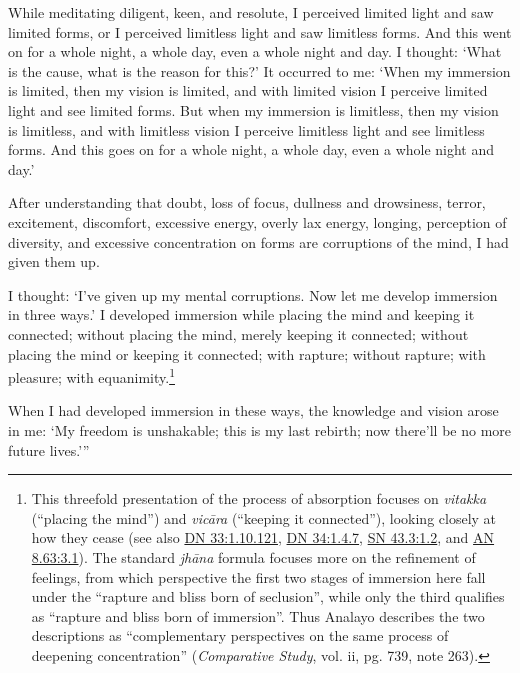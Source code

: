 \documentclass[12pt,openany]{book}%
\begin{document}
While meditating diligent, keen, and resolute, I perceived limited light and saw limited forms, or I perceived limitless light and saw limitless forms. And this went on for a whole night, a whole day, even a whole night and day. I thought: ‘What is the cause, what is the reason for this?’ It occurred to me: ‘When my immersion is limited, then my vision is limited, and with limited vision I perceive limited light and see limited forms. But when my immersion is limitless, then my vision is limitless, and with limitless vision I perceive limitless light and see limitless forms. And this goes on for a whole night, a whole day, even a whole night and day.’ 

After understanding that doubt, loss of focus, dullness and drowsiness, terror, excitement, discomfort, excessive energy, overly lax energy, longing, perception of diversity, and excessive concentration on forms are corruptions of the mind, I had given them up. 

I thought: ‘I’ve given up my mental corruptions. Now let me develop immersion in three ways.’ I developed immersion while placing the mind and keeping it connected; without placing the mind, merely keeping it connected; without placing the mind or keeping it connected; with rapture; without rapture; with pleasure; with equanimity.\footnote{This threefold presentation of the process of absorption focuses on \textit{vitakka} (“placing the mind”) and \textit{\textsanskrit{vicāra}} (“keeping it connected”), looking closely at how they cease (see also \href{https://suttacentral.net/dn33/en/sujato\#1.10.121}{DN 33:1.10.121}, \href{https://suttacentral.net/dn34/en/sujato\#1.4.7}{DN 34:1.4.7}, \href{https://suttacentral.net/sn43.3/en/sujato\#1.2}{SN 43.3:1.2}, and \href{https://suttacentral.net/an8.63/en/sujato\#3.1}{AN 8.63:3.1}). The standard \textit{\textsanskrit{jhāna}} formula focuses more on the refinement of feelings, from which perspective the first two stages of immersion here fall under the “rapture and bliss born of seclusion”, while only the third qualifies as “rapture and bliss born of immersion”. Thus Analayo describes the two descriptions as “complementary perspectives on the same process of deepening concentration” (\emph{Comparative Study}, vol. ii, pg. 739, note 263). } 

When I had developed immersion in these ways, the knowledge and vision arose in me: ‘My freedom is unshakable; this is my last rebirth; now there’ll be no more future lives.’” 
\end{document}
